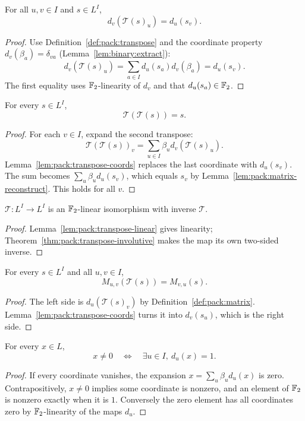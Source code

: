 \begin{lemma}\label{lem:pack:transpose-coords}
For all $u,v\in I$ and $s\in L^I$,
\[
 \boxed{d_v(\mathcal T(s)_u)=d_u(s_v).}
\]
\end{lemma}
\begin{proof}
Use Definition~\ref{def:pack:transpose}
and the coordinate property
$d_v(\beta_a)=\delta_{va}$
(Lemma~\ref{lem:binary:extract}):
\[
 d_v(\mathcal T(s)_u)
 =\sum_{a\in I}d_u(s_a)d_v(\beta_a)
 =d_u(s_v).
\]
The first equality uses $\mathbb{F}_2$-linearity
of $d_v$ and that $d_u(s_a)\in\mathbb{F}_2$.
\end{proof}

\begin{theorem}\label{thm:pack:transpose-involutive}
For every $s\in L^I$,
\[
 \boxed{\mathcal T(\mathcal T(s))=s.}
\]
\end{theorem}
\begin{proof}
For each $v\in I$, expand the second transpose:
\[
 \mathcal T(\mathcal T(s))_v
 =\sum_{u\in I}\beta_u
   d_v(\mathcal T(s)_u).
\]
Lemma~\ref{lem:pack:transpose-coords}
replaces the last coordinate with $d_u(s_v)$.
The sum becomes $\sum_u\beta_ud_u(s_v)$,
which equals $s_v$ by
Lemma~\ref{lem:pack:matrix-reconstruct}.
This holds for all $v$.
\end{proof}

\begin{corollary}\label{cor:pack:transpose-iso}
$\mathcal T:L^I\to L^I$ is an $\mathbb{F}_2$-linear
isomorphism with inverse $\mathcal T$.
\end{corollary}
\begin{proof}
Lemma~\ref{lem:pack:transpose-linear}
gives linearity; Theorem~\ref{thm:pack:transpose-involutive}
makes the map its own two-sided inverse.
\end{proof}

\begin{lemma}\label{lem:pack:matrix-transpose}
For every $s\in L^I$ and all $u,v\in I$,
\[
 \boxed{M_{u,v}(\mathcal T(s))=M_{v,u}(s).}
\]
\end{lemma}
\begin{proof}
The left side is $d_u(\mathcal T(s)_v)$
by Definition~\ref{def:pack:matrix}.
Lemma~\ref{lem:pack:transpose-coords}
turns it into $d_v(s_u)$,
which is the right side.
\end{proof}

\begin{lemma}\label{lem:pack:coordinate-separates}
For every $x\in L$,
\[
 x\neq0\quad\Longleftrightarrow\quad
 \exists u\in I,\ d_u(x)=1.
\]
\end{lemma}
\begin{proof}
If every coordinate vanishes, the expansion
$x=\sum_u\beta_ud_u(x)$ is zero.
Contrapositively, $x\neq0$ implies
some coordinate is nonzero, and an element
of $\mathbb{F}_2$ is nonzero exactly when it is $1$.
Conversely the zero element has all coordinates
zero by $\mathbb{F}_2$-linearity of the maps $d_u$.
\end{proof}

